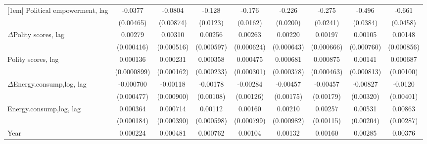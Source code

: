 \begin{table}[htbp]
\begin{tabular}{l*{8}{c}}
[1em]
Political empowerment, lag   &     -0.0377\sym{***}&     -0.0804\sym{***}&      -0.128\sym{***}&      -0.176\sym{***}&      -0.226\sym{***}&      -0.275\sym{***}&      -0.496\sym{***}&      -0.661\sym{***}\\
                    &   (0.00465)         &   (0.00874)         &    (0.0123)         &    (0.0162)         &    (0.0200)         &    (0.0241)         &    (0.0384)         &    (0.0458)         \\
[1em]
$\Delta$Polity scores, lag          &     0.00279\sym{***}&     0.00310\sym{***}&     0.00256\sym{***}&     0.00263\sym{***}&     0.00220\sym{***}&     0.00197\sym{***}&     0.00105         &     0.00148\sym{*}  \\
                    &  (0.000416)         &  (0.000516)         &  (0.000597)         &  (0.000624)         &  (0.000643)         &  (0.000666)         &  (0.000760)         &  (0.000856)         \\
[1em]
Polity scores, lag          &    0.000136         &    0.000231         &    0.000358         &    0.000475         &    0.000681\sym{*}  &    0.000875\sym{*}  &     0.00141\sym{*}  &    0.000687         \\
                    & (0.0000899)         &  (0.000162)         &  (0.000233)         &  (0.000301)         &  (0.000378)         &  (0.000463)         &  (0.000813)         &   (0.00100)         \\
[1em]
$\Delta$Energy.consump,log, lag           &   -0.000700         &    -0.00118         &    -0.00178         &    -0.00284\sym{**} &    -0.00457\sym{***}&    -0.00457\sym{**} &    -0.00827\sym{**} &     -0.0120\sym{***}\\
                    &  (0.000477)         &  (0.000900)         &   (0.00108)         &   (0.00126)         &   (0.00175)         &   (0.00179)         &   (0.00320)         &   (0.00401)         \\
[1em]
Energy.consump,log, lag            &    0.000364\sym{*}  &    0.000714\sym{*}  &     0.00112\sym{*}  &     0.00160\sym{**} &     0.00210\sym{**} &     0.00257\sym{**} &     0.00531\sym{**} &     0.00863\sym{***}\\
                    &  (0.000184)         &  (0.000390)         &  (0.000598)         &  (0.000799)         &  (0.000982)         &   (0.00115)         &   (0.00204)         &   (0.00287)         \\
[1em]
Year                &    0.000224\sym{***}&    0.000481\sym{***}&    0.000762\sym{***}&     0.00104\sym{***}&     0.00132\sym{***}&     0.00160\sym{***}&     0.00285\sym{***}&     0.00376\sym{***}\\

\end{tabular}
\end{table}
